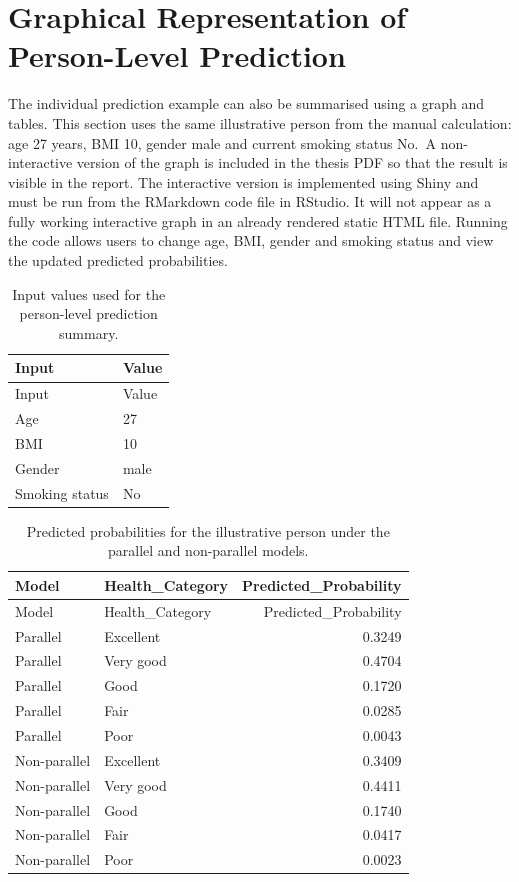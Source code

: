 \documentclass{article}
\begin{document}
\section*{Graphical Representation of Person-Level
Prediction}\label{graphical-representation-of-person-level-prediction}

The individual prediction example can also be summarised using a graph
and tables. This section uses the same illustrative person from the
manual calculation: age 27 years, BMI 10, gender male and current
smoking status No.~A non-interactive version of the graph is included in
the thesis PDF so that the result is visible in the report. The
interactive version is implemented using Shiny and must be run from the
RMarkdown code file in RStudio. It will not appear as a fully working
interactive graph in an already rendered static HTML file. Running the
code allows users to change age, BMI, gender and smoking status and view
the updated predicted probabilities.

\begin{longtable}[]{@{}ll@{}}
\caption{Input values used for the person-level prediction
summary.}\tabularnewline
\toprule\noalign{}
Input & Value \\
\midrule\noalign{}
\endfirsthead
\toprule\noalign{}
Input & Value \\
\midrule\noalign{}
\endhead
\bottomrule\noalign{}
\endlastfoot
Age & 27 \\
BMI & 10 \\
Gender & male \\
Smoking status & No \\
\end{longtable}

\begin{longtable}[]{@{}llr@{}}
\caption{Predicted probabilities for the illustrative person under the
parallel and non-parallel models.}\tabularnewline
\toprule\noalign{}
Model & Health\_Category & Predicted\_Probability \\
\midrule\noalign{}
\endfirsthead
\toprule\noalign{}
Model & Health\_Category & Predicted\_Probability \\
\midrule\noalign{}
\endhead
\bottomrule\noalign{}
\endlastfoot
Parallel & Excellent & 0.3249 \\
Parallel & Very good & 0.4704 \\
Parallel & Good & 0.1720 \\
Parallel & Fair & 0.0285 \\
Parallel & Poor & 0.0043 \\
Non-parallel & Excellent & 0.3409 \\
Non-parallel & Very good & 0.4411 \\
Non-parallel & Good & 0.1740 \\
Non-parallel & Fair & 0.0417 \\
Non-parallel & Poor & 0.0023 \\
\end{longtable}
\end{document}
